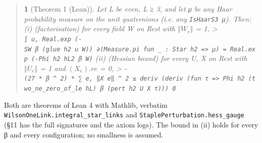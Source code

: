 \documentclass[11pt,a4paper]{article}
\theoremstyle{named}
\newtheorem*{namedthm}{}
\begin{document}
\begin{quote}
\begin{namedthm}[Theorem 1 (Lean)]
Let L be even, L ≥ 3, and let μ be any Haar probability measure on the unit quaternions (i.e. any \texttt{IsHaarS3\ \allowbreak{}μ}). Then: (i) \textit{(factorisation)} for every field W on Rest with $‖W_e‖$ = 1, \textgreater{} \texttt{∫\ \allowbreak{}u,\ \allowbreak{}Real.\allowbreak{}exp\ \allowbreak{}(-SW\ \allowbreak{}β\ \allowbreak{}(glue\ \allowbreak{}h2\ \allowbreak{}u\ \allowbreak{}W))\ \allowbreak{}∂(Measure.\allowbreak{}pi\ \allowbreak{}fun\ \allowbreak{}\_\allowbreak{}\ \allowbreak{}:\ \allowbreak{}Star\ \allowbreak{}h2\ \allowbreak{}=\textgreater{}\ \allowbreak{}μ)\ \allowbreak{}=\ \allowbreak{}Real.\allowbreak{}exp\ \allowbreak{}(-Phi\ \allowbreak{}h2\ \allowbreak{}hL2\ \allowbreak{}β\ \allowbreak{}W)} (ii) \textit{(Hessian bound)} for every U, X on Rest with $‖U_e‖$ = 1 and $(X_e).re$ = 0, \textgreater{} \texttt{-(27\ \allowbreak{}*\ \allowbreak{}β\ \allowbreak{}\textasciicircum{}\ \allowbreak{}2)\ \allowbreak{}*\ \allowbreak{}∑\ \allowbreak{}e,\ \allowbreak{}‖X\ \allowbreak{}e‖\ \allowbreak{}\textasciicircum{}\ \allowbreak{}2\ \allowbreak{}≤\ \allowbreak{}deriv\ \allowbreak{}(deriv\ \allowbreak{}(fun\ \allowbreak{}τ\ \allowbreak{}=\textgreater{}\ \allowbreak{}Phi\ \allowbreak{}h2\ \allowbreak{}(two\_\allowbreak{}ne\_\allowbreak{}zero\_\allowbreak{}of\_\allowbreak{}le\ \allowbreak{}hL)\ \allowbreak{}β\ \allowbreak{}(pert\ \allowbreak{}h2\ \allowbreak{}U\ \allowbreak{}X\ \allowbreak{}τ)))\ \allowbreak{}0}
\end{namedthm}
\end{quote}
Both are theorems of Lean 4 with Mathlib, verbatim \texttt{WilsonOneLink.\allowbreak{}integral\_\allowbreak{}star\_\allowbreak{}links} and \texttt{StaplePerturbation.\allowbreak{}hess\_\allowbreak{}gauge} (§11 has the full signatures and the axiom logs). The bound in (ii) holds for every β and every configuration; no smallness is assumed.
\end{document}
